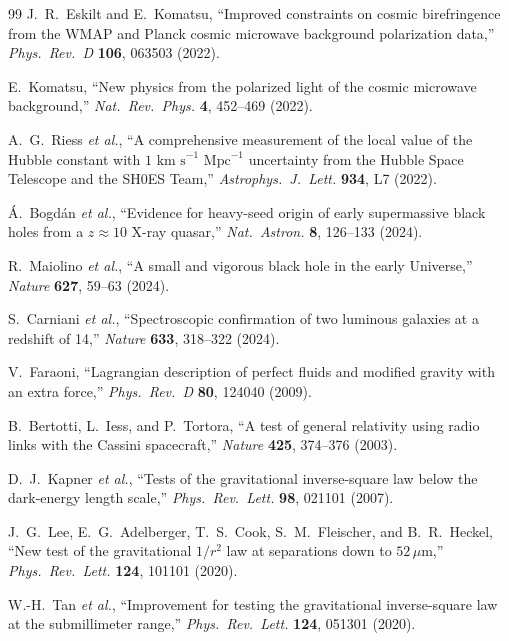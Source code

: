 \documentclass[11pt,a4paper]{article}
\theoremstyle{plain}
\theoremstyle{definition}
\theoremstyle{remark}
\numberwithin{equation}{section}
\begin{document}
\begin{thebibliography}{99}
J.~R.~Eskilt and E.~Komatsu, ``Improved constraints on cosmic birefringence from the WMAP and Planck cosmic microwave background polarization data,'' \textit{Phys.\ Rev.\ D} \textbf{106}, 063503 (2022).

E.~Komatsu, ``New physics from the polarized light of the cosmic microwave background,'' \textit{Nat.\ Rev.\ Phys.} \textbf{4}, 452--469 (2022).

A.~G.~Riess \textit{et al.}, ``A comprehensive measurement of the local value of the Hubble constant with $1\text{ km s}^{-1}\text{ Mpc}^{-1}$ uncertainty from the Hubble Space Telescope and the SH0ES Team,'' \textit{Astrophys.\ J.\ Lett.} \textbf{934}, L7 (2022).

\'A.~Bogd\'an \textit{et al.}, ``Evidence for heavy-seed origin of early supermassive black holes from a $z \approx 10$ X-ray quasar,'' \textit{Nat.\ Astron.} \textbf{8}, 126--133 (2024).

R.~Maiolino \textit{et al.}, ``A small and vigorous black hole in the early Universe,'' \textit{Nature} \textbf{627}, 59--63 (2024).

S.~Carniani \textit{et al.}, ``Spectroscopic confirmation of two luminous galaxies at a redshift of 14,'' \textit{Nature} \textbf{633}, 318--322 (2024).

V.~Faraoni, ``Lagrangian description of perfect fluids and modified gravity with an extra force,'' \textit{Phys.\ Rev.\ D} \textbf{80}, 124040 (2009).

B.~Bertotti, L.~Iess, and P.~Tortora, ``A test of general relativity using radio links with the Cassini spacecraft,'' \textit{Nature} \textbf{425}, 374--376 (2003).

D.~J.~Kapner \textit{et al.}, ``Tests of the gravitational inverse-square law below the dark-energy length scale,'' \textit{Phys.\ Rev.\ Lett.} \textbf{98}, 021101 (2007).

J.~G.~Lee, E.~G.~Adelberger, T.~S.~Cook, S.~M.~Fleischer, and B.~R.~Heckel, ``New test of the gravitational $1/r^2$ law at separations down to $52\,\mu\text{m}$,'' \textit{Phys.\ Rev.\ Lett.} \textbf{124}, 101101 (2020).

W.-H.~Tan \textit{et al.}, ``Improvement for testing the gravitational inverse-square law at the submillimeter range,'' \textit{Phys.\ Rev.\ Lett.} \textbf{124}, 051301 (2020).


\end{thebibliography}
\end{document}
